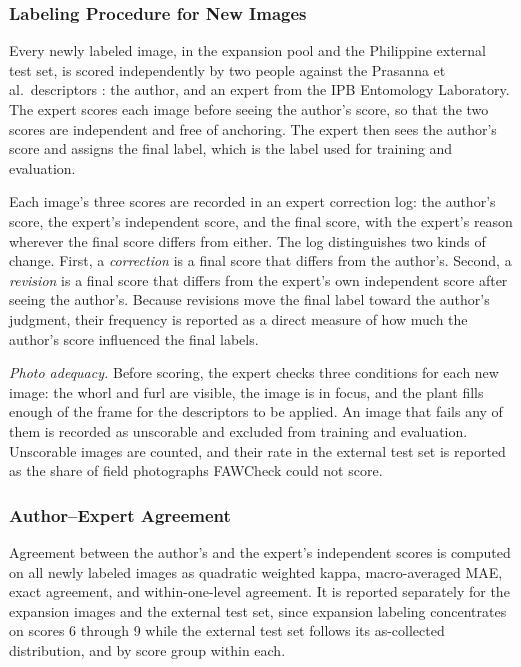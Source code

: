 \documentclass{icsthesis}
\begin{document}
\begin{mainmatter}
				\subsubsection{Labeling Procedure for New Images}\label{sec:labeling}

					Every newly labeled image, in the expansion pool and the Philippine external
					test set, is scored independently by two people against the Prasanna et
					al.\ descriptors \citep{prasanna2018}: the author, and an expert from the IPB
					Entomology Laboratory. The expert scores each image before seeing the author's
					score, so that the two scores are independent and free of anchoring. The expert
					then sees the author's score and assigns the final label, which is the label
					used for training and evaluation.

					Each image's three scores are recorded in an expert correction log: the author's
					score, the expert's independent score, and the final score, with the expert's
					reason wherever the final score differs from either. The log distinguishes two
					kinds of change. First, a \textit{correction} is a final score that differs from
					the author's. Second, a \textit{revision} is a final score that differs from the
					expert's own independent score after seeing the author's. Because revisions move
					the final label toward the author's judgment, their frequency is reported as a
					direct measure of how much the author's score influenced the final labels.

					\textit{Photo adequacy.} Before scoring, the expert checks three conditions for
					each new image: the whorl and furl are visible, the image is in focus, and the
					plant fills enough of the frame for the descriptors to be applied. An image that
					fails any of them is recorded as unscorable and excluded from training and
					evaluation. Unscorable images are counted, and their rate in the external test
					set is reported as the share of field photographs FAWCheck could not score. 

				\subsubsection{Author--Expert Agreement}\label{sec:agreement}

					Agreement between the author's and the expert's independent scores is computed
					on all newly labeled images as quadratic weighted kappa, macro-averaged MAE,
					exact agreement, and within-one-level agreement. It is reported separately for
					the expansion images and the external test set, since expansion labeling
					concentrates on scores 6 through 9 while the external test set follows its
					as-collected distribution, and by score group within each.


\end{mainmatter}
\end{document}
